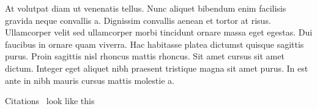 At volutpat diam ut venenatis tellus. Nunc aliquet bibendum enim facilisis gravida neque convallis a. Dignissim convallis aenean et tortor at risus. Ullamcorper velit sed ullamcorper morbi tincidunt ornare massa eget egestas. Dui faucibus in ornare quam viverra. Hac habitasse platea dictumst quisque sagittis purus. Proin sagittis nisl rhoncus mattis rhoncus. Sit amet cursus sit amet dictum. Integer eget aliquet nibh praesent tristique magna sit amet purus. In est ante in nibh mauris cursus mattis molestie a.







Citations~\cite{IEEEexample:IEEEwebsite} look like this~\cite{IEEEexample:biblatex} 

